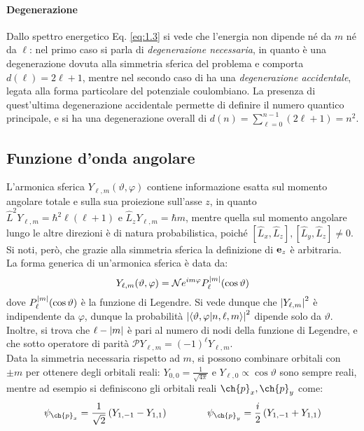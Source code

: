 \paragraph{Degenerazione}

Dallo spettro energetico Eq. \ref{eq:1.3} si vede che l'energia non dipende né da $ m $ né da $ \ell $: nel primo caso si parla di \textit{degenerazione necessaria}, in quanto è una degenerazione dovuta alla simmetria sferica del problema e comporta $ d(\ell) = 2\ell + 1 $, mentre nel secondo caso di ha una \textit{degenerazione accidentale}, legata alla forma particolare del potenziale coulombiano. La presenza di quest'ultima degenerazione accidentale permette di definire il numero quantico principale, e si ha una degenerazione overall di $ d(n) = \sum_{\ell = 0}^{n-1} (2\ell + 1) = n^2 $.

\subsection{Funzione d'onda angolare}

L'armonica sferica $ Y_{\ell,m}(\vartheta,\varphi) $ contiene informazione esatta sul momento angolare totale e sulla sua proiezione sull'asse $ z $, in quanto $ \hat{L}^2 Y_{\ell,m} = \hbar^2 \ell (\ell + 1) $ e $ \hat{L}_z Y_{\ell,m} = \hbar m $, mentre quella sul momento angolare lungo le altre direzioni è di natura probabilistica, poiché $ [\hat{L}_x , \hat{L}_z],[\hat{L}_y , \hat{L}_z] \neq 0 $. Si noti, però, che grazie alla simmetria sferica la definizione di $ \mathbf{e}_z $ è arbitraria.\\
La forma generica di un'armonica sferica è data da:
\begin{equation}
	Y_{\ell,m}(\vartheta,\varphi) = \mathcal{N} e^{i m \varphi} P_\ell^{\left\lvert m\right\rvert}(\cos \vartheta)
	\label{eq:1.4}
\end{equation}
dove $ P_\ell^{\left\lvert m\right\rvert}(\cos \vartheta) $ è la funzione di Legendre. Si vede dunque che $ \left\lvert Y_{\ell,m}\right\rvert^2 $ è indipendente da $ \varphi $, dunque la probabilità $ \left\lvert\braket{\vartheta,\varphi | n,\ell,m}\right\rvert^2 $ dipende solo da $ \vartheta $. Inoltre, si trova che $ \ell - \left\lvert m\right\rvert $ è pari al numero di nodi della funzione di Legendre, e che sotto operatore di parità $ \mathcal{P} Y_{\ell,m} = (-1)^\ell Y_{\ell,m} $.\\
Data la simmetria necessaria rispetto ad $ m $, si possono combinare orbitali con $ \pm m $ per ottenere degli orbitali reali: $ Y_{0,0} = \frac{1}{\sqrt{4\pi}} $ e $ Y_{\ell,0} \propto \cos{\vartheta} $ sono sempre reali, mentre ad esempio si definiscono gli orbitali reali $ \ch{p}_x , \ch{p}_y $ come:
\begin{equation*}
	\psi_{\ch{p}_x} = \frac{1}{\sqrt{2}} \left( Y_{1,-1} - Y_{1,1} \right)
	\qquad \qquad
	\psi_{\ch{p}_y} = \frac{i}{2} \left( Y_{1,-1} + Y_{1,1} \right)
\end{equation*}

